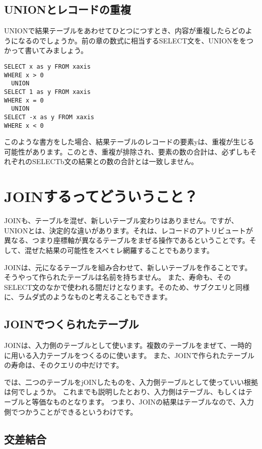 \subsection{UNIONとレコードの重複}

UNIONで結果テーブルをあわせてひとつにつすとき、内容が重複したらどのようになるのでしょうか。前の章の数式に相当するSELECT文を、UNIONををつかって書いてみましょう。

\begin{verbatim}
SELECT x as y FROM xaxis
WHERE x > 0
  UNION
SELECT 1 as y FROM xaxis
WHERE x = 0
  UNION
SELECT -x as y FROM xaxis
WHERE x < 0
\end{verbatim}

このような書方をした場合、結果テーブルのレコードの要素yは、重複が生じる可能性があります。このとき、重複が排除され、要素の数の合計は、必ずしもそれぞれのSELECTb文の結果との数の合計とは一致しません。

\section{JOINするってどういうこと？}

JOINも、テーブルを混ぜ、新しいテーブル変わりはありません。ですが、UNIONとは、決定的な違いがあります。それは、レコードのアトリビュートが異なる、つまり座標軸が異なるテーブルをまぜる操作であるということです。そして、混ぜた結果の可能性をスベｔレ網羅することでもあります。

JOINは、元になるテーブルを組み合わせて、新しいテーブルを作ることです。そうやって作られたテーブルは名前を持ちません。
また、寿命も、そのSELECT文のなかで使われる間だけとなります。そのため、サブクエリと同様に、ラムダ式のようなものと考えることもできます。

\subsection{JOINでつくられたテーブル}

JOINは、入力側のテーブルとして使います。複数のテーブルをまぜて、一時的に用いる入力テーブルをつくるのに使います。
また、JOINで作られたテーブルの寿命は、そのクエリの中だけです。

では、二つのテーブルをjOINしたものを、入力側テーブルとして使っていい根拠は何でしょうか。
これまでも説明したとおり、入力側はテーブル、もしくはテーブルと等価なものとなります。
つまり、JOINの結果はテーブルなので、入力側でつかうことができるというわけです。


\subsection{交差結合}

